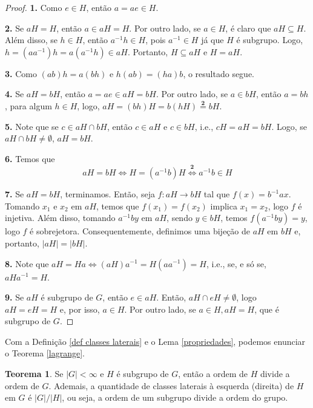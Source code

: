 \documentclass[a4paper,portuguese,11pt,twoside, leqno]{book}
\theoremstyle{definition}
\newtheorem{theorem}{Teorema}[section]
\begin{document}
	\begin{proof}
		\textbf{1.} Como $e\in H$, então $a = ae \in H$.
		\par\vspace{0.4cm}
		\textbf{2.} Se $aH = H$, então $a\in aH = H$. Por outro lado, se $a\in H$, é claro que $aH\subseteq H$. Além disso, se $h\in H$, então $a^{-1}h\in H$, pois $a^{-1}\in H$ já que $H$ é subgrupo. Logo, $h = (aa^{-1})h = a(a^{-1}h)\in aH$. Portanto, $H\subseteq aH$ e $H = aH$. 
		\par\vspace{0.4cm}
		\textbf{3.} Como $(ab)h = a(bh)$ e $h(ab) = (ha)b$, o resultado segue.
		\par\vspace{0.4cm}
		\textbf{4.} Se $aH = bH$, então $a = ae\in aH = bH$. Por outro lado, se $a\in bH$, então $a = bh$, para algum $h\in H$, logo, $aH = (bh)H = b(hH) \overset{\textbf{2}}{=} bH$.
		\par\vspace{0.4cm}
		\textbf{5.} Note que se $c\in aH\cap bH$, então $c\in aH$ e $c\in bH$, i.e., $cH = aH = bH$. Logo, se $aH\cap bH\neq\emptyset$, $aH = bH$.
		\par\vspace{0.4cm}
		\textbf{6.} Temos que
		\begin{equation*}
		aH = bH \Leftrightarrow H = (a^{-1}b)H \overset{\textbf{2}}{\Leftrightarrow} a^{-1}b \in H
		\end{equation*}
		\par\vspace{0.4cm}
		\textbf{7.} Se $aH = bH$, terminamos. Então, seja $f: aH\to bH$ tal que $f(x) = b^{-1}ax$. Tomando $x_1$ e $x_2$ em $aH$, temos que $f(x_1) = f(x_2)$ implica $x_1=x_2$, logo $f$ é injetiva. Além disso, tomando $a^{-1}by$ em $aH$, sendo $y\in bH$, temos $f(a^{-1}by) = y$, logo $f$ é sobrejetora. Consequentemente, definimos uma bijeção de $aH$ em $bH$ e, portanto, $|aH| = |bH|$.
		\par\vspace{0.4cm}
		\textbf{8.} Note que $aH = Ha \Leftrightarrow (aH)a^{-1} = H(aa^{-1}) = H$, i.e., se, e só se, $aHa^{-1} = H$.
		\par\vspace{0.4cm}
		\textbf{9.} Se $aH$ é subgrupo de $G$, então $e\in aH$. Então, $aH\cap eH \neq \emptyset$, logo $aH = eH = H$ e, por isso, $a\in H$. Por outro lado, se $a\in H, aH = H$, que é subgrupo de $G$.	
		
	\end{proof}
	\par\vspace{0.3cm} Com a Definição \eqref{def classes laterais} e o Lema \eqref{propriedades}, podemos enunciar o Teorema \eqref{lagrange}.
	\begin{theorem}
		\label{lagrange}
		Se $|G|<\infty$ e $H$ é subgrupo de $G$, então a ordem de $H$ divide a ordem de $G$. Ademais, a quantidade de classes laterais à esquerda (direita) de $H$ em $G$ é $|G|/|H|$, ou seja, a ordem de um subgrupo divide a ordem do grupo. 
	\end{theorem}
	
\end{document}
